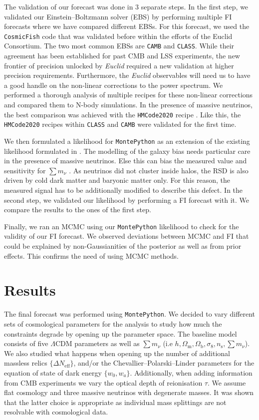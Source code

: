 \documentclass[a4paper,11pt]{article}
\newcommand{\euclid}{\textit{Euclid}\xspace}
\newcommand{\dneff}{\Delta N_\mathrm{eff}}
\newcommand{\summnu}{\sum m_\nu}
\newcommand{\camb}{\texttt{CAMB}\xspace}
\newcommand{\class}{\texttt{CLASS}\xspace}
\newcommand{\montepython}{\texttt{MontePython}\xspace}
\newcommand{\cosmicfish}{\texttt{CosmicFish}\xspace}
\begin{document}
The validation of our forecast was done in 3 separate steps. In the first step, we validated our Einstein--Boltzmann solver (EBS) by performing multiple FI forecasts where we have compared different EBSs. For this forecast, we used the \cosmicfish code that was validated before within the efforts of the Euclid Consortium\cite{Blanchard-EP7}. The two most common EBSs are \camb\cite{2011ascl.soft02026L} and \class\cite{Diego_Blas_2011}. While their agreement has been established for past CMB and LSS experiments, the new frontier of precision unlocked by \euclid required a new validation at higher precision requirements. Furthermore, the \euclid observables will need us to have a good handle on the non-linear corrections to the power spectrum. We performed a thorough analysis of multiple recipes for these non-linear corrections and compared them to N-body simulations. In the presence of massive neutrinos, the best comparison was achieved with the \texttt{HMCode2020} recipe \cite{Mead_2021}. Like this, the \texttt{HMCode2020} recipes within \class and \camb were validated for the first time.

We then formulated a likelihood for \montepython\cite{Audren:2012wb} as an extension of the existing likelihood formulated in \cite{Casas23}. The modelling of the galaxy bias needs particular care in the presence of massive neutrinos. Else this can bias the measured value and sensitivity for $\summnu$ \cite{Vagnozzi_2018}. As neutrinos did not cluster inside halos, the RSD is also driven by cold dark matter and baryonic matter only\cite{Villaescusa_Navarro_2018}. For this reason, the measured signal has to be additionally modified to describe this defect. In the second step, we validated our likelihood by performing a FI forecast with it. We compare the results to the ones of the first step.

Finally, we ran an MCMC using our \montepython likelihood to check for the validity of our FI forecast. We observed deviations between MCMC and FI that could be explained by non-Gaussianities of the posterior as well as from prior effects. This confirms the need of using MCMC methods. 

\section{Results}

The final forecast was performed using \montepython. We decided to vary different sets of cosmological parameters for the analysis to study how much the constraints degrade by opening up the parameter space. The baseline model consists of  five $\varLambda$CDM parameters as well as $\summnu$ (i.e $h, \Omega_\mathrm{m}, \Omega_\mathrm{b}, \sigma_8, n_\mathrm{s}, \summnu$). We also studied what happens when opening up the number of additional massless relics $\{\dneff\}$, and/or the Chevallier--Polarski--Linder parameters for the equation of state of dark energy $\{w_0,w_a\}$. Additionally, when adding information from CMB experiments we vary the optical depth of reionisation $\tau$. We assume flat cosmology and three massive neutrinos with degenerate masses. It was shown that the latter choice is appropriate as individual mass splittings are not resolvable with cosmological data\cite{Lesgourgues:2013sjj}.
\end{document}
